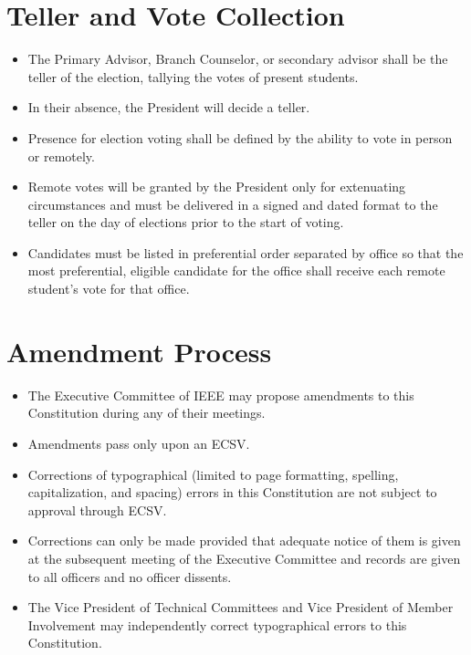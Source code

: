 \documentclass[12pt]{constitution}
\begin{document}
\section{Teller and Vote Collection}
\label{sec:elect_teller}
\begin{itemize}
    \item The Primary Advisor, Branch Counselor, or secondary advisor shall be the teller of the election, tallying the votes of present students.
    \item In their absence, the President will decide a teller.
    \item Presence for election voting shall be defined by the ability to vote in person or remotely.
    \item Remote votes will be granted by the President only for extenuating circumstances and must be delivered in a signed and dated format to the teller on the day of elections prior to the start of voting.
    \item Candidates must be listed in preferential order separated by office so that the most preferential, eligible candidate for the office shall receive each remote student's vote for that office.
\end{itemize}


\label{art:amend}

\section{Amendment Process}
\label{sec:amend_process}
\begin{itemize}
    \item The Executive Committee of IEEE may propose amendments to this Constitution during any of their meetings.
    \item Amendments pass only upon an ECSV.
    \item Corrections of typographical (limited to page formatting, spelling, capitalization, and spacing) errors in this Constitution are not subject to approval through ECSV.
    \item Corrections can only be made provided that adequate notice of them is given at the subsequent meeting of the Executive Committee and records are given to all officers and no officer dissents.
    \item The Vice President of Technical Committees and Vice President of Member Involvement may independently correct typographical errors to this Constitution.
\end{itemize}
\end{document}
